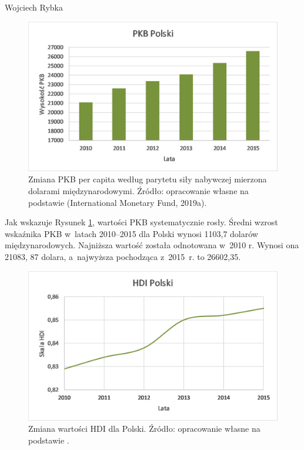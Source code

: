 \begin{artplenv}{Wojciech Rybka}
\begin{figure}[h]
	\centering
	\includegraphics[width=1\textwidth]{ART_Rybka/pkb_polski.png} 
	\caption{Zmiana PKB per capita według parytetu siły nabywczej mierzona dolarami międzynarodowymi.
		Źródło: opracowanie własne na podstawie
		\parencite{international_monetary_fund_world_2019a}
		\label{ref:RNDl3ypL6FseV}(International Monetary Fund, 2019a).
	}
	\label{fig1:ryb}
\end{figure}


%
%
%

Jak wskazuje Rysunek \ref{fig1:ryb}, wartości PKB systematycznie rosły. Średni wzrost wskaźnika PKB w~latach 2010–2015 dla Polski
wynosi 1103,7 dolarów międzynarodowych. Najniższa wartość została odnotowana w~2010 r. Wynosi ona 21083, 87 dolara,
a~najwyższa pochodząca z~2015~r. to 26602,35. 

\begin{figure}[H]
	\centering
	\includegraphics[width=1\textwidth]{ART_Rybka/hdi_polski.png} 
	\caption{Zmiana wartości HDI dla Polski.
		Źródło: opracowanie własne na podstawie
		\parencite{united_nations_development_programme_human_2019}.
	}
	\label{fig2:ryb}
\end{figure}



\end{artplenv}

